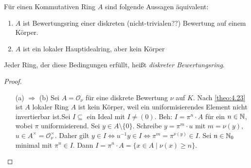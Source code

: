 \documentclass[../main.tex]{subfiles}
\begin{document}
\begin{theorem}%
    Für einen Kommutativen Ring $A$ sind folgende Aussagen äquivalent:
    \begin{enumerate}[label=(\alph*)]
        \item $A$ ist Bewertungsring einer diskreten (nicht-trivialen??) Bewertung auf einem Körper.
        \item $A$ ist ein lokaler Hauptidealring, aber kein Körper
    \end{enumerate}
    Jeder Ring, der diese Bedingungen erfüllt, heißt \emph{diskreter Bewertungsring}.
\end{theorem}
\begin{proof} $ $
    \begin{itemize}
        \item[(a) $\Rightarrow$ (b)]
        Sei $A=\mathcal{O}_\nu$ für eine diskrete Bewertung $\nu$ auf $K$.
        Nach \ref{theo:4.23} ist $A$ lokaler Ring
        $A$ ist kein Körper, weil ein uniformisierendes Element nicht invertierbar ist.
        Sei $I\subseteq$ ein Ideal mit $I\neq (0)$.
        Beh: $I=\pi^n\cdot A$ für ein $n\in \mathbb{N}$, wobei $\pi$ uniformisierend.
        Sei $y\in A\setminus\{0\}$. Schreibe $y=\pi^m\cdot u$ mit $m=\nu(y)$, $u\in A^\times = \mathcal{O}_\nu^\times$.
        Daher gilt $y\in I\Leftrightarrow u^{-1}y\in I \Leftrightarrow \pi^m = \pi^{\nu(y)}\in I$.
        Sei $n\in \mathbb{N}_0$ minimal mit $\pi^n\in I$.
        Dann $I = \pi^n\cdot A = \{x\in A\mid \nu(x)\geq n\}$.
        

\end{itemize}
\end{proof}
\end{document}

